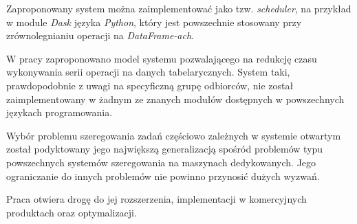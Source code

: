 \documentclass[brudnopis]{xmgr}
\begin{document}
Zaproponowany system można zaimplementować jako tzw. \emph{scheduler}, na przykład w module \emph{Dask} \cite{dask} języka \emph{Python}, który jest powszechnie stosowany przy zrównolegnianiu operacji na \emph{DataFrame-ach}.



\summary

W pracy zaproponowano model systemu pozwalającego na redukcję czasu wykonywania serii operacji na danych tabelarycznych. System taki, prawdopodobnie z uwagi na specyficzną grupę odbiorców, nie został zaimplementowany w żadnym ze znanych modułów dostępnych w powszechnych językach programowania.
\medskip

Wybór problemu szeregowania zadań częściowo zależnych w systemie otwartym został podyktowany jego największą generalizacją spośród problemów typu powszechnych systemów szeregowania na maszynach dedykowanych. Jego ograniczanie do innych problemów nie powinno przynosić dużych wyzwań.
\medskip

Praca otwiera drogę do jej rozszerzenia, implementacji w komercyjnych produktach oraz optymalizacji.








\listoftables

\listoffigures

\oswiadczenie
\end{document}
